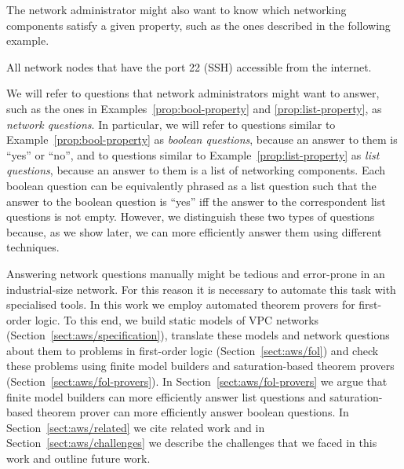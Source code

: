 The network administrator might also want to know which networking components satisfy a given property, such as the ones described in the following example.
\begin{example}\label{prop:list-property}
All network nodes that have the port 22 (SSH) accessible from the internet.
\end{example}

We will refer to questions that network administrators might want to answer, such as the ones in Examples~\ref{prop:bool-property} and \ref{prop:list-property}, as \emph{network questions}. In particular, we will refer to questions similar to Example~\ref{prop:bool-property} as \emph{boolean questions}, because an answer to them is ``yes'' or ``no'', and to questions similar to Example~\ref{prop:list-property} as \emph{list questions}, because an answer to them is a list of networking components. Each boolean question can be equivalently phrased as a list question such that the answer to the boolean question is ``yes'' iff the answer to the correspondent list questions is not empty. However, we distinguish these two types of questions because, as we show later, we can more efficiently answer them using different techniques.

Answering network questions manually might be tedious and error-prone in an industrial-size network. For this reason it is necessary to automate this task with specialised tools. In this work we employ automated theorem provers for first-order logic. To this end, we build static models of VPC networks (Section~\ref{sect:aws/specification}), translate these models and network questions about them to problems in first-order logic (Section~\ref{sect:aws/fol}) and check these problems using finite model builders and saturation-based theorem provers (Section~\ref{sect:aws/fol-provers}). In Section~\ref{sect:aws/fol-provers} we argue that finite model builders can more efficiently answer list questions and saturation-based theorem prover can more efficiently answer boolean questions. In Section~\ref{sect:aws/related} we cite related work and in Section~\ref{sect:aws/challenges} we describe the challenges that we faced in this work and outline future work.


